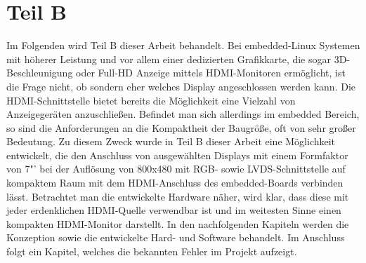 \chapter{Teil B}
\label{cha:TeilB}
Im Folgenden wird Teil B dieser Arbeit behandelt. Bei embedded-Linux Systemen mit höherer Leistung und vor allem einer dedizierten Grafikkarte, die sogar 3D-Beschleunigung oder Full-HD Anzeige mittels HDMI-Monitoren ermöglicht, ist die Frage nicht, ob sondern eher welches Display angeschlossen werden kann. Die HDMI-Schnittstelle bietet bereits die Möglichkeit eine Vielzahl von Anzeigegeräten anzuschließen. Befindet man sich allerdings im embedded Bereich, so sind die Anforderungen an die Kompaktheit der Baugröße, oft von sehr großer Bedeutung. Zu diesem Zweck wurde in Teil B dieser Arbeit eine Möglichkeit entwickelt, die den Anschluss von ausgewählten Displays mit einem Formfaktor von 7"' bei der Auflösung von 800x480 mit RGB- sowie LVDS-Schnittstelle auf kompaktem Raum mit dem HDMI-Anschluss des embedded-Boards verbinden lässt. Betrachtet man die entwickelte Hardware näher, wird klar, dass diese mit jeder erdenklichen HDMI-Quelle verwendbar ist und im weitesten Sinne einen kompakten HDMI-Monitor darstellt.
In den nachfolgenden Kapiteln werden die Konzeption sowie die entwickelte Hard- und Software behandelt. Im Anschluss folgt ein Kapitel, welches die bekannten Fehler im Projekt aufzeigt.\newpage





